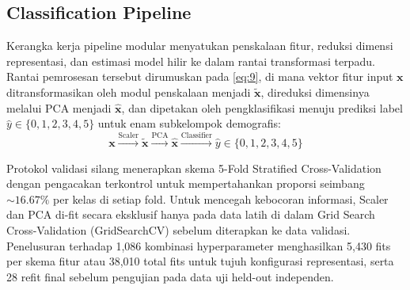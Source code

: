 \subsection{Classification Pipeline}
\label{sec:classification_pipeline}

Kerangka kerja pipeline modular menyatukan penskalaan fitur, reduksi dimensi representasi, dan estimasi model hilir ke dalam rantai transformasi terpadu. Rantai pemrosesan tersebut dirumuskan pada \eqref{eq:9}, di mana vektor fitur input $\mathbf{x}$ ditransformasikan oleh modul penskalaan menjadi $\tilde{\mathbf{x}}$, direduksi dimensinya melalui PCA menjadi $\hat{\mathbf{x}}$, dan dipetakan oleh pengklasifikasi menuju prediksi label $\hat{y} \in \{0, 1, 2, 3, 4, 5\}$ untuk enam subkelompok demografis:
\begin{equation}
\mathbf{x} \xrightarrow{\text{Scaler}} \tilde{\mathbf{x}} \xrightarrow{\text{PCA}} \hat{\mathbf{x}} \xrightarrow{\text{Classifier}} \hat{y} \in \{0, 1, 2, 3, 4, 5\}
\label{eq:9}
\end{equation}

Protokol validasi silang menerapkan skema 5-Fold Stratified Cross-Validation dengan pengacakan terkontrol untuk mempertahankan proporsi seimbang $\sim 16.67\%$ per kelas di setiap fold. Untuk mencegah kebocoran informasi, Scaler dan PCA di-fit secara eksklusif hanya pada data latih di dalam Grid Search Cross-Validation (GridSearchCV) sebelum diterapkan ke data validasi. Penelusuran terhadap 1,086 kombinasi hyperparameter menghasilkan 5,430 fits per skema fitur atau 38,010 total fits untuk tujuh konfigurasi representasi, serta 28 refit final sebelum pengujian pada data uji held-out independen.
